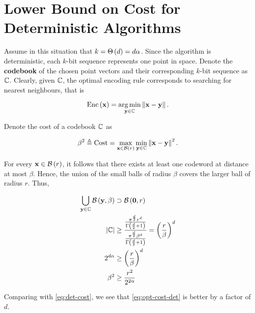 \documentclass[twoside]{article}
\begin{document}
\section{Lower Bound on Cost for Deterministic Algorithms}

Assume in this situation that \(k = \Theta\left(d\right) = d\alpha\). Since the algorithm is deterministic, each \(k\)-bit sequence represents one point in space. Denote the \textbf{codebook} of the chosen point vectors and their corresponding \(k\)-bit sequence as \(\mathbb C\). Clearly, given \(\mathbb C\), the optimal encoding rule corresponds to searching for nearest neighbours, that is

\begin{equation}
    \mathrm{Enc}\left(\boldsymbol{\mathbf{x}}\right) = \operatorname*{arg\,min}_{\boldsymbol{\mathbf{y}}\in\mathbb C}\left\lVert\boldsymbol{\mathbf{x}}-\boldsymbol{\mathbf{y}}\right\rVert.
    \label{eq:enc-opt}
\end{equation}

Denote the cost of a codebook \(\mathbb C\) as

\begin{equation}
    \beta^2 \triangleq \mathrm{Cost} = \max_{\boldsymbol{\mathbf{x}}\in\mathcal B\left(r\right)}\min_{\boldsymbol{\mathbf{y}}\in\mathbb C}\left\lVert\boldsymbol{\mathbf{x}}-\boldsymbol{\mathbf{y}}\right\rVert^2.
    \label{eq:cost-codebook}
\end{equation}

For every \(\boldsymbol{\mathbf{x}}\in\mathcal B\left(r\right)\), it follows that there exists at least one codeword at distance at most \(\beta\). Hence, the union of the small balls of radius \(\beta\) covers the larger ball of radius \(r\). Thus,

\begin{align}
    \bigcup_{\boldsymbol{\mathbf{y}}\in\mathbb C}\mathcal B\left(\boldsymbol{\mathbf{y}},\beta\right) &\supset \mathcal B\left(\boldsymbol{\mathbf{0}},r\right) \\
    \left\vert\mathbb C\right\vert &\ge \frac{\frac{\pi^{\frac{d}{2}}r^d}{\Gamma\left(\frac{d}{2}+1\right)}}{\frac{\pi^{\frac{d}{2}}\beta^d}{\Gamma\left(\frac{d}{2}+1\right)}} = \left(\frac{r}{\beta}\right)^d \\
    2^{d\alpha} &\ge \left(\frac{r}{\beta}\right)^d \\
    \beta^2 &\ge \frac{r^2}{2^{2\alpha}}
    \label{eq:opt-cost-det}
\end{align}

Comparing with \eqref{eq:det-cost}, we see that \eqref{eq:opt-cost-det} is better by a factor of \(d\).
\end{document}
